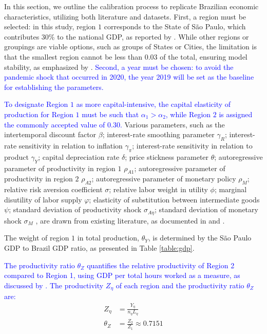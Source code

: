 \documentclass[../thesis.tex]{subfiles}
\begin{document}
In this section, we outline the calibration process to replicate Brazilian economic characteristics, utilizing both literature and datasets. First, a region must be selected: in this study, region $1$ corresponds to the State of São Paulo, which contributes $30\%$ to the national GDP, as reported by \textcite{ibge_produto_2024}. While other regions or groupings are viable options, such as groups of States or Cities, the limitation is that the smallest region cannot be less than $0.03$ of the total, ensuring model stability, as emphasized by \textcite{konopkova_pitfalls_2019}. \textcolor{blue}{Second, a year must be chosen: to avoid the pandemic shock that occurred in 2020, the year 2019 will be set as the baseline for establishing the parameters.}

\textcolor{blue}{To designate Region $1$ as more capital-intensive, the capital elasticity of production for Region $1$ must be such that $\alpha_{1} > \alpha_{2}$, while Region $2$ is assigned the commonly accepted value of $0.30$.} Various parameters, such as the 
intertemporal discount factor $\beta$; 
interest-rate smoothing parameter $\gamma_{R}$; 
interest-rate sensitivity in relation to inflation $\gamma_{\pi}$; 
interest-rate sensitivity in relation to product $\gamma_{Y}$; 
capital depreciation rate $\delta$; 
price stickness parameter $\theta$;
autoregressive parameter of productivity in region $1$ $\rho_{A1}$;
autoregressive parameter of productivity in region $2$ $\rho_{A2}$;
autoregressive parameter of monetary policy $\rho_{M}$;
relative risk aversion coefficient $\sigma$;
relative labor weight in utility $\phi$;
marginal disutility of labor supply $\varphi$;
elasticity of substitution between intermediate goods $\psi$;
standard deviation of productivity shock $\sigma_{A\eta}$;
standard deviation of monetary shock $\sigma_{M}$
, are drawn from existing literature, as documented in \textcite{costa_junior_understanding_2016} and \textcite{pereira_rbc_2021}.

The weight of region $1$ in total production, $\theta_{Y}$, is determined by the São Paulo GDP to Brazil GDP ratio, as presented in Table \eqref{table:gdp}.

\textcolor{blue}{The productivity ratio $\theta_{Z}$ quantifies the relative productivity of Region 2 compared to Region 1, using GDP per total hours worked as a measure, as discussed by \textcite{krugman_defining_1997}. The productivity $Z_{\eta}$ of each region and the productivity ratio $\theta_{Z}$ are:}
\begin{align}
	Z_{\eta}  &= \frac{Y_{\eta}}{n_{\eta} L_{\eta}} \\
	\theta_{Z} &= \frac{Z_{2}}{Z_{1}} \approx 0.7151
\end{align}
\end{document}
